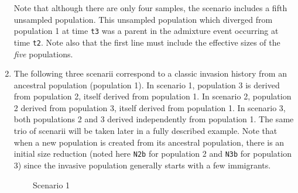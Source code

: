 \begin{enumerate}
Note that although there are only four samples, the scenario
includes a fifth unsampled population. This unsampled population which diverged from
population 1 at time \texttt{t3} was a parent in the admixture event
occurring at  time \texttt{t2}. Note also that the first line must include the effective sizes of the \emph{five} populations.\\

\item The following three scenarii correspond to a classic invasion history from an ancestral population (population 1). In scenario 1, population 3 is derived from population 2, itself derived from population 1. In scenario 2, population 2 derived from population 3, itself derived from population 1. In scenario 3, both populations 2 and 3 derived independently from population 1. The same trio of scenarii will be taken later in a fully described example.
Note that when a new population is created from its ancestral population, there is an initial size reduction (noted here \texttt{N2b} for population 2 and  \texttt{N3b} for population 3) since the invasive population generally starts with a few immigrants. 
\end{enumerate}
\medskip \ \ \ \ \ \ \ \  Scenario 1
